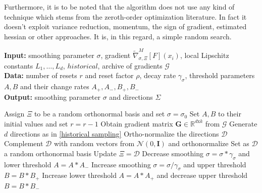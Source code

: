 Furthermore, it is to be noted that the algorithm does not use any kind of technique which stems from the zeroth-order optimization literature. In fact it doesn't exploit variance reduction, momentum, the sign of gradient, estimated hessian or other approaches. It is, in this regard, a simple random search.

\begin{algorithm}[!ht]
\caption{Parameter update}\label{ASHGFSubroutine}

\hspace*{\algorithmicindent} \textbf{Input:} smoothing parameter $\sigma$, gradient $ \widetilde{\nabla}_{\sigma, \Xi}^{M}[F](x_i)$, local Lipschitz constants $L_1,\dots,L_d$, $historical$, archive of gradients $\mathcal{G}$\\
\hspace*{\algorithmicindent} \textbf{Data:} number of resets $r$ and reset factor $\rho$, decay rate $\gamma_\sigma$, threshold parameters $A,B$ and their change rates $A_+, A_-, B_+, B_-$\\
\hspace*{\algorithmicindent} \textbf{Output:} smoothing parameter $\sigma$ and directions $\Sigma$
\begin{algorithmic}[1]

    \State Assign $\Xi$ to be a random orthonormal basis and set $\sigma = \sigma_0$
    \State Set $A,B$ to their initial values and set $r = r-1$
\Else
        \State Obtain gradient matrix $\mathbf{G}\in\mathbb{R}^{d\text{x}k}$ from $\mathcal{G}$
        \State Generate $d$ directions as in \ref{historical sampling}
        \State Ortho-normalize the directions $\mathcal{D}$
            \State Complement $\mathcal{D}$ with random vectors from $\mathcal{N}\left(0, \mathbf{I}\right)$ and orthonormalize
        \EndWhile
    \Else
        \State Set as $\mathcal{D}$ a random orthonormal basis
    \EndIf
    \State Update $\Xi = \mathcal{D}$
        \State Decrease smoothing $\sigma = \sigma * \gamma_{\sigma}$ and lower threshold $A=A*A_-$
        \State Increase smoothing $\sigma = \sigma / \gamma_{\sigma}$ and upper threshold $B=B*B_+$
    \Else
        \State Increase lower threshold $A=A*A_+$ and decrease upper threshold $B=B*B_-$
    \EndIf
\EndIf

\end{algorithmic}
\end{algorithm}

